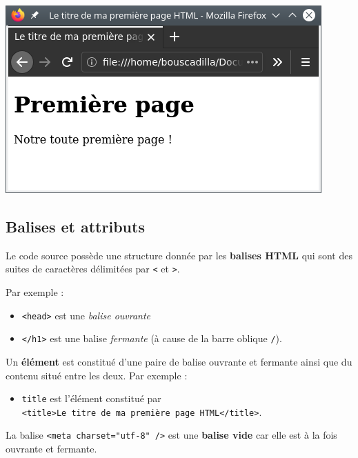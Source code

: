 \documentclass[a4paper,17pt]{extarticle}
\let\origfigure\figure
\let\endorigfigure\endfigure
\renewenvironment{figure}[1][2] {
    \expandafter\origfigure\expandafter[H]
} {
    \endorigfigure
}
\providecommand{\tightlist}{%
      \setlength{\itemsep}{0pt}\setlength{\parskip}{0pt}}
\begin{document}
\begin{reponse}
\begin{figure}
\centering
\includegraphics{res/premier_exemple.png}
\caption{Capture d'écran du premier exemple}
\end{figure}

            \end{reponse}
    \hypertarget{balises-et-attributs}{%
\subsection{Balises et attributs}\label{balises-et-attributs}}

    Le code source possède une structure donnée par les \textbf{balises
HTML} qui sont des suites de caractères délimitées par
\texttt{\textless{}} et \texttt{\textgreater{}}.

Par exemple :

\begin{itemize}
\tightlist
\item
  \texttt{\textless{}head\textgreater{}} est une \emph{balise ouvrante}
\item
  \texttt{\textless{}/h1\textgreater{}} est une balise \emph{fermante}
  (à cause de la barre oblique \texttt{/}).
\end{itemize}

Un \textbf{élément} est constitué d'une paire de balise ouvrante et
fermante ainsi que du contenu situé entre les deux. Par exemple :

\begin{itemize}
\tightlist
\item
  \texttt{title} est l'élément constitué par
  \texttt{\textless{}title\textgreater{}Le\ titre\ de\ ma\ première\ page\ HTML\textless{}/title\textgreater{}}.
\end{itemize}

La balise \texttt{\textless{}meta\ charset="utf-8"\ /\textgreater{}} est
une \textbf{balise vide} car elle est à la fois ouvrante et fermante.
\end{document}
